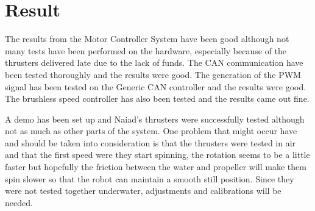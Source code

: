 \section{Result}\label{sec:result}
The results from the Motor Controller System have been good although not many tests have been performed on the hardware, especially because of the thrusters delivered late due to the lack of funds. The CAN communication have been tested thoroughly and the results were good. The generation of the PWM signal has been tested on the Generic CAN controller and the results were good. The brushless speed controller has also been tested and the results came out fine. 

 A demo has been set up and Naiad's thrusters were successfully tested although not as much as other parts of the system. One problem that might occur have and should be taken into consideration is that the thrusters were tested in air and  that the first speed were they start spinning, the rotation seems to be a little faster but hopefully the friction between the water and propeller will make them spin slower so that the robot can maintain a smooth still position. Since they were not tested together underwater, adjustments and calibrations will be needed.  

